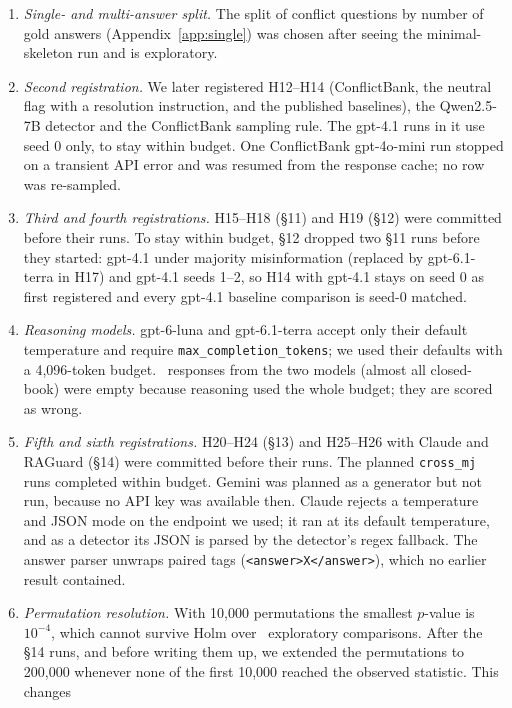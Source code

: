 \begin{enumerate}[leftmargin=*,itemsep=1pt,topsep=2pt]
throughout (Section~\ref{sec:setup}), which makes some exploratory differences that were bold in earlier drafts
non-significant.
\item \emph{Single- and multi-answer split.} The split of conflict questions by number of gold answers
(Appendix~\ref{app:single}) was chosen after seeing the minimal-skeleton run and is exploratory.
\item \emph{Second registration.} We later registered H12--H14 (ConflictBank, the neutral flag with a
resolution instruction, and the published baselines), the Qwen2.5-7B detector and the ConflictBank sampling rule.
The gpt-4.1 runs in it use seed 0 only, to stay within budget. One ConflictBank gpt-4o-mini run stopped on a
transient API error and was resumed from the response cache; no row was re-sampled.
\item \emph{Third and fourth registrations.} H15--H18 (\S11) and H19 (\S12) were committed before their runs. To stay
within budget, \S12 dropped two \S11 runs before they started: gpt-4.1 under majority misinformation (replaced by
gpt-6.1-terra in H17) and gpt-4.1 seeds 1--2, so H14 with gpt-4.1 stays on seed 0 as first registered and every
gpt-4.1 baseline comparison is seed-0 matched.
\item \emph{Reasoning models.} gpt-6-luna and gpt-6.1-terra accept only their default temperature and require
\texttt{max\_completion\_tokens}; we used their defaults with a 4,096-token budget. \Nempty\ responses from the
two models (almost all closed-book) were empty because reasoning used the whole budget; they are scored as wrong.
\item \emph{Fifth and sixth registrations.} H20--H24 (\S13) and H25--H26 with Claude and RAGuard (\S14) were
committed before their runs. The planned \texttt{cross\_mj} runs completed within budget. Gemini was planned
as a generator but not run, because no API key was available then. Claude rejects a temperature and JSON mode on the endpoint we used; it
ran at its default temperature, and as a detector its JSON is parsed by the detector's regex fallback. The answer
parser unwraps paired tags (\texttt{<answer>X</answer>}), which no earlier result contained.
\item \emph{Permutation resolution.} With 10,000 permutations the smallest $p$-value is $10^{-4}$, which cannot
survive Holm over \nExploratory\ exploratory comparisons. After the \S14 runs, and before writing them up, we
extended the permutations to 200,000 whenever none of the first 10,000 reached the observed statistic. This changes

\end{enumerate}
